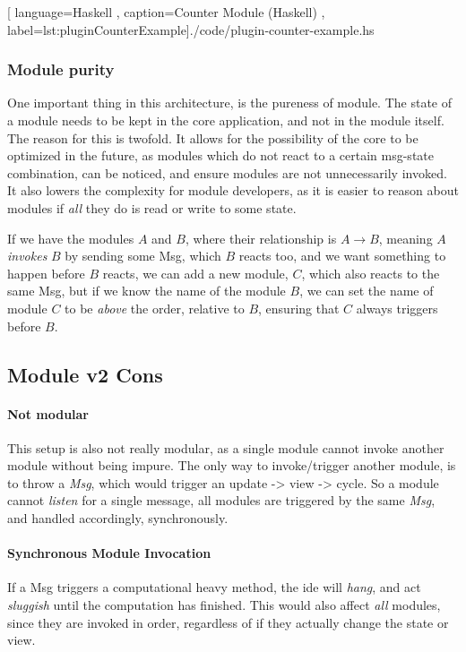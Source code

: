 \begin{center}
  
    [ language=Haskell
    , caption={Counter Module (Haskell)}
    , label=lst:pluginCounterExample]{./code/plugin-counter-example.hs}
\end{center}

\subsubsection{Module purity}

One important thing in this architecture, is the pureness of module. The state
of a module needs to be kept in the core application, and not in the module
itself. The reason for this is twofold. It allows for the possibility of the
core to be optimized in the future, as modules which do not react to a certain
msg-state combination, can be noticed, and ensure modules are not unnecessarily
invoked. It also lowers the complexity for module developers, as it is easier to
reason about modules if \textit{all} they do is read or write to some state.

If we have the modules $A$ and $B$, where their relationship is $A \to B$,
meaning $A$ \textit{invokes} $B$ by sending some Msg, which $B$ reacts too, and
we want something to happen before $B$ reacts, we can add a new module, $C$,
which also reacts to the same Msg, but if we know the name of the module $B$,
we can set the name of module $C$ to be \textit{above} the order, relative to
$B$, ensuring that $C$ always triggers before $B$.

\subsection{Module v2 Cons}

\paragraph{Not modular} This setup is also not really modular, as a single
module cannot invoke another module without being impure. The only way to
invoke/trigger another module, is to throw a \textit{Msg}, which would trigger
an update -> view -> cycle. So a module cannot \textit{listen} for a single
message, all modules are triggered by the same \textit{Msg}, and handled
accordingly, synchronously.

\paragraph{Synchronous Module Invocation} If a Msg triggers a computational
heavy method, the \gls{ide} will \textit{hang}, and act \textit{sluggish} until
the computation has finished. This would also affect \textit{all} modules,
since they are invoked in order, regardless of if they actually change the
state or view.

